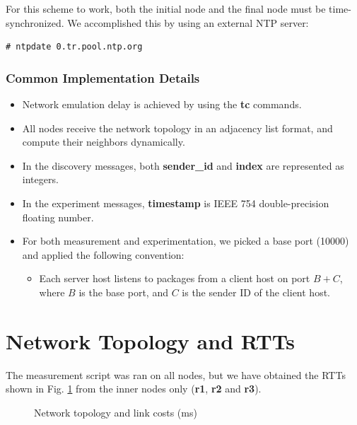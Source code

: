 \documentclass[conference]{IEEEtran}
\begin{document}
For this scheme to work, both the initial node and the final node must be time-synchronized. We
accomplished this by using an external NTP server:

\begin{lstlisting}
# ntpdate 0.tr.pool.ntp.org
\end{lstlisting}

\subsubsection{Common Implementation Details}
\begin{itemize}
    \item Network emulation delay is achieved by using the \textbf{tc} commands.
    \item All nodes receive the network topology in an adjacency list format, and compute their neighbors dynamically.
    \item In the discovery messages, both \textbf{sender\_id} and \textbf{index} are represented as integers.
    \item In the experiment messages, \textbf{timestamp} is IEEE 754 double-precision floating number.
    \item For both measurement and experimentation, we picked a base port (10000) and applied the following convention:
    \begin{itemize}
        \item Each server host listens to packages from a client host on port $B + C$, where $B$ is the base port, and $C$ is the sender ID of the client host.
    \end{itemize}
\end{itemize}

\section{Network Topology and RTTs}
The measurement script was ran on all nodes, but we have obtained the RTTs shown in Fig. \ref{fig:links}
from the inner nodes only (\textbf{r1}, \textbf{r2} and \textbf{r3}).

\begin{figure}
\centering
{}
\caption{Network topology and link costs (ms)}
\label{fig:links}
\end{figure}
\end{document}
